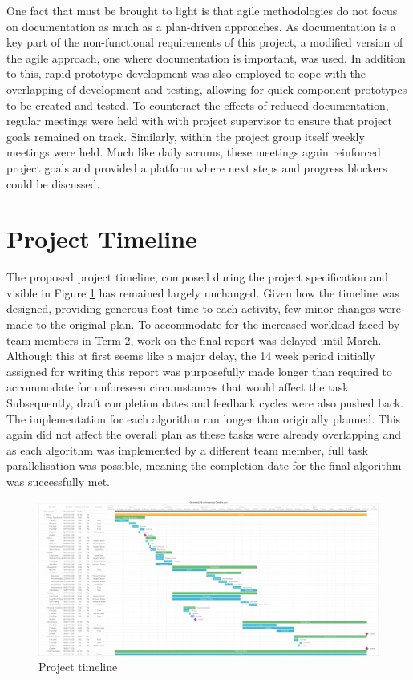 One fact that must be brought to light is that agile methodologies do not focus on documentation as much as a plan-driven approaches. As documentation is a key part of the non-functional requirements of this project, a modified version of the agile approach, one where documentation is important, was used. In addition to this, rapid prototype development was also employed to cope with the overlapping of development and testing, allowing for quick component prototypes to be created and tested. To counteract the effects of reduced documentation, regular meetings were held with with project supervisor to ensure that project goals remained on track. Similarly, within the project group itself weekly meetings were held. Much like daily scrums, these meetings again reinforced project goals and provided a platform where next steps and progress blockers could be discussed.

\section{Project Timeline}
The proposed project timeline, composed during the project specification and visible in Figure \ref{fig:timeline} has remained largely unchanged. Given how the timeline was designed, providing generous float time to each activity, few minor changes were made to the original plan. To accommodate for the increased workload faced by team members in Term 2, work on the final report was delayed until March. Although this at first seems like a major delay, the 14 week period initially assigned for writing this report was purposefully made longer than required to accommodate for unforeseen circumstances that would affect the task. Subsequently, draft completion dates and feedback cycles were also pushed back. The implementation for each algorithm ran longer than originally planned. This again did not affect the overall plan as these tasks were already overlapping and as each algorithm was implemented by a different team member, full task parallelisation was possible, meaning the completion date for the final algorithm was successfully met.

\begin{figure}[H]
  \centering
  \includegraphics[width=1.0\textwidth]{Images/ProjectManagement/timeline}
  \caption{Project timeline} 
  \label{fig:timeline} 
\end{figure}

